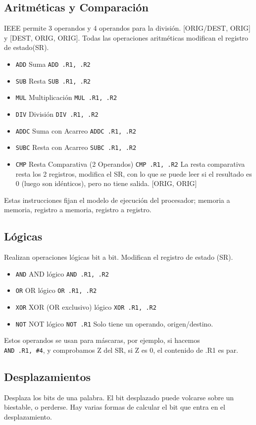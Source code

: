 \documentclass[a4paper,11pt,spanish]{report}
\begin{document}
\subsection{Aritméticas y Comparación}
IEEE permite 3 operandos y 4 operandos para la división.
[ORIG/DEST, ORIG] y [DEST, ORIG, ORIG]. Todas las operaciones aritméticas modifican el registro de estado(SR).
\begin{itemize}
\item \verb|ADD| Suma \textrightarrow \verb|ADD .R1, .R2|
\item \verb|SUB| Resta \textrightarrow \verb|SUB .R1, .R2|
\item \verb|MUL| Multiplicación \textrightarrow \verb|MUL .R1, .R2|
\item \verb|DIV| División \textrightarrow \verb|DIV .R1, .R2|
\item \verb|ADDC| Suma con Acarreo \textrightarrow \verb|ADDC .R1, .R2|
\item \verb|SUBC| Resta con Acarreo \textrightarrow \verb|SUBC .R1, .R2|
\item \verb|CMP| Resta Comparativa (2 Operandos) \textrightarrow \verb|CMP .R1, .R2| La resta comparativa resta los 2 registros, modifica el SR, con lo que se puede leer si el resultado es 0 (luego son idénticos), pero no tiene salida. [ORIG, ORIG]
\end{itemize}
Estas instrucciones fijan el modelo de ejecución del procesador; memoria a memoria, registro a memoria, registro a registro.
\subsection{Lógicas}
Realizan operaciones lógicas bit a bit. Modifican el registro de estado (SR).
\begin{itemize}
\item \verb|AND| AND lógico \textrightarrow \verb|AND .R1, .R2|
\item \verb|OR| OR lógico \textrightarrow \verb|OR .R1, .R2|
\item \verb|XOR| XOR (OR exclusivo) lógico \textrightarrow \verb|XOR .R1, .R2|
\item \verb|NOT| NOT lógico \textrightarrow \verb|NOT .R1| Solo tiene un operando, origen/destino.
\end{itemize}
Estos operandos se usan para máscaras, por ejemplo, si hacemos \\ \verb|AND .R1, #4|, y comprobamos Z del SR, si Z es 0, el contenido de .R1 es par.
\subsection{Desplazamientos}
Desplaza los bits de una palabra. El bit desplazado puede volcarse sobre un biestable, o perderse. Hay varias formas de calcular el bit que entra en el desplazamiento.
\end{document}
